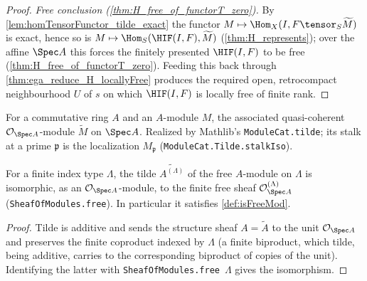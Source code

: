 \begin{theorem}
\begin{proof}
    \emph{Free conclusion (\cref{thm:H_free_of_functorT_zero}).} By
    \cref{lem:homTensorFunctor_tilde_exact} the functor
    $M \mapsto \Hom_X(I, F \tensor_S \widetilde M)$ is exact, hence so is
    $M \mapsto \Hom_S(\HIF(I,F), \widetilde M)$ (\cref{thm:H_represents}); over the
    affine $\Spec A$ this forces the finitely presented $\HIF(I,F)$ to be free
    (\cref{thm:H_free_of_functorT_zero}). Feeding this back through
    \cref{thm:ega_reduce_H_locallyFree} produces the required open, retrocompact
    neighbourhood $U$ of $s$ on which $\HIF(I,F)$ is locally free of finite rank.
  \end{proof}
\end{theorem}


\begin{definition}
  \label{def:tildeMod}
  \mathlibok
  For a commutative ring $A$ and an $A$-module $M$, the associated
  quasi-coherent $\mathcal{O}_{\Spec A}$-module $\widetilde M$ on $\Spec A$.
  Realized by Mathlib's \texttt{ModuleCat.tilde}; its stalk at a prime
  $\mathfrak p$ is the localization $M_{\mathfrak p}$
  (\texttt{ModuleCat.Tilde.stalkIso}).
\end{definition}

\begin{lemma}
  \label{lem:tilde_free}
  For a finite index type $\Lambda$, the tilde $\widetilde{A^{(\Lambda)}}$ of the
  free $A$-module on $\Lambda$ is isomorphic, as an
  $\mathcal{O}_{\Spec A}$-module, to the finite free sheaf
  $\mathcal{O}_{\Spec A}^{(\Lambda)}$ (\texttt{SheafOfModules.free}). In
  particular it satisfies \cref{def:isFreeMod}.
  \begin{proof}
    Tilde is additive and sends the structure sheaf $A = \widetilde A$ to the
    unit $\mathcal{O}_{\Spec A}$ and preserves the finite coproduct indexed by
    $\Lambda$ (a finite biproduct, which tilde, being additive, carries to the
    corresponding biproduct of copies of the unit). Identifying the latter with
    \texttt{SheafOfModules.free}~$\Lambda$ gives the isomorphism.
  \end{proof}
\end{lemma}

